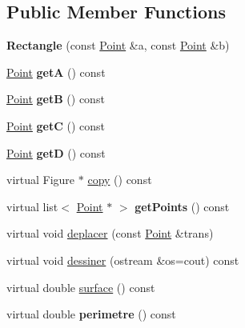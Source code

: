 \subsection*{Public Member Functions}
\begin{DoxyCompactItemize}
\item 
{\bfseries Rectangle} (const \hyperlink{class_point}{Point} \&a, const \hyperlink{class_point}{Point} \&b)\hypertarget{class_rectangle_a624f003522cefccbf7d7cbbb25484319}{}\label{class_rectangle_a624f003522cefccbf7d7cbbb25484319}

\item 
\hyperlink{class_point}{Point} {\bfseries getA} () const \hypertarget{class_rectangle_a2f4d4c5ae1fa57ffc1fd1db3edcd00b1}{}\label{class_rectangle_a2f4d4c5ae1fa57ffc1fd1db3edcd00b1}

\item 
\hyperlink{class_point}{Point} {\bfseries getB} () const \hypertarget{class_rectangle_ab50635c7b64c91fc6a68890db61bfae6}{}\label{class_rectangle_ab50635c7b64c91fc6a68890db61bfae6}

\item 
\hyperlink{class_point}{Point} {\bfseries getC} () const \hypertarget{class_rectangle_a5339db7a9327c904ccc6df350212cac4}{}\label{class_rectangle_a5339db7a9327c904ccc6df350212cac4}

\item 
\hyperlink{class_point}{Point} {\bfseries getD} () const \hypertarget{class_rectangle_a10f2ecee98b54ac6d9b23a15449a1bd5}{}\label{class_rectangle_a10f2ecee98b54ac6d9b23a15449a1bd5}

\item 
virtual Figure $\ast$ \hyperlink{class_rectangle_a79aa738432ccb76ac84173bec4c31b7c}{copy} () const 
\item 
virtual list$<$ \hyperlink{class_point}{Point} $\ast$ $>$ {\bfseries get\+Points} () const \hypertarget{class_rectangle_a0db01df72e63eebc2c175f58f966cf94}{}\label{class_rectangle_a0db01df72e63eebc2c175f58f966cf94}

\item 
virtual void \hyperlink{class_rectangle_acfa7c56f2c0a087e908c4f7bc542c826}{deplacer} (const \hyperlink{class_point}{Point} \&trans)
\item 
virtual void \hyperlink{class_rectangle_a853147554cb4938530f75f83cf43b6c4}{dessiner} (ostream \&os=cout) const 
\item 
virtual double \hyperlink{class_rectangle_ac2ecb396e91ee632188df53c2322fbef}{surface} () const 
\item 
virtual double {\bfseries perimetre} () const \hypertarget{class_rectangle_ad01dd31ee53ad6920cd126382bb09b90}{}\label{class_rectangle_ad01dd31ee53ad6920cd126382bb09b90}


\end{DoxyCompactItemize}
